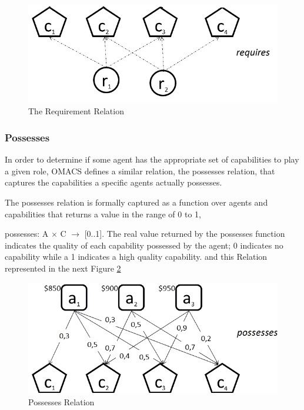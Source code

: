 \begin{figure}[th]
	\centering
		\includegraphics[scale=0.5]{chapiter1/img/RelRequire}
	\caption{\label{fig:The Requirment Relation}The Requirement Relation }
\end{figure}



\subsubsection{Possesses}
In order to determine if some agent has the appropriate set of capabilities to play a given role, OMACS defines a similar relation, the possesses relation, that captures the capabilities a specific agents actually possesses. \cite{omacs4}

The possesses relation is formally captured as a function over agents and capabilities that returns a value in the range of 0 to 1,

 possesses: A $\times$ C $\rightarrow$ [0..1]. The real value returned by the possesses function indicates the quality of each capability possessed by the agent; 0 indicates no capability while a 1 indicates a high quality capability. \cite{omacs4}
and this Relation represented in the next Figure \ref{fig:Possesses Relation}


\begin{figure}[th]
	\centering
		\includegraphics[scale=0.5]{chapiter1/img/RelPossess}
	\caption{\label{fig:Possesses Relation}Possesses Relation }
\end{figure}


